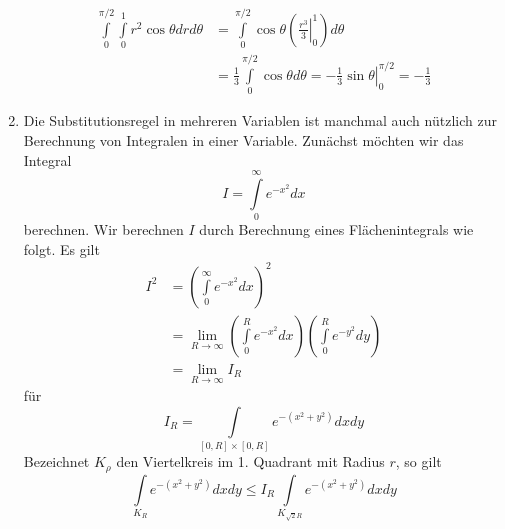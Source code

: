 \begin{enumerate}
\begin{align*}
\int\limits_0^{\pi /2} {\int\limits_0^1 {{r^2}\cos \theta drd\theta } }  &=\int\limits_0^{\pi /2} {\cos \theta \left( {\left. {\frac{{{r^3}}}{3}} \right|_0^1} \right)d\theta } \\
 &=\frac{1}{3}\int\limits_0^{\pi /2} {\cos \theta d\theta }  = \left. { - \frac{1}{3}\sin \theta } \right|_0^{\pi /2} =  - \frac{1}{3}
\end{align*}
\item Die Substitutionsregel in mehreren Variablen ist manchmal auch nützlich zur Berechnung von Integralen in einer Variable. Zunächst möchten wir das Integral \[ I=\int\limits_0^\infty e^{-x^2} dx\] berechnen. Wir berechnen $I$ durch Berechnung eines Flächenintegrals wie folgt. Es gilt
\begin{align*}
{I^2} &={\left( {\int\limits_0^\infty  {{e^{ - {x^2}}}dx} } \right)^2}\\
 &=\mathop {\lim }\limits_{R \to \infty } \left( {\int\limits_0^R {{e^{ - {x^2}}}dx} } \right)\left( {\int\limits_0^R {{e^{ - {y^2}}}dy} } \right)\\
 &=\mathop {\lim }\limits_{R \to \infty } {I_R}
\end{align*}
für \[{I_R} = \int\limits_{\left[ {0,R} \right] \times \left[ {0,R} \right]} {{e^{ - \left( {{x^2} + {y^2}} \right)}}dxdy} \]
Bezeichnet $K_\rho$ den Viertelkreis im 1. Quadrant mit Radius $r$, so gilt
\[\int\limits_{{K_R}} {{e^{ - \left( {{x^2} + {y^2}} \right)}}dxdy \le {I_R}\int\limits_{{K_{\sqrt 2 R}}} {{e^{ - \left( {{x^2} + {y^2}} \right)}}dxdy} } \]

\begin{center}
\end{center}


\end{enumerate}
